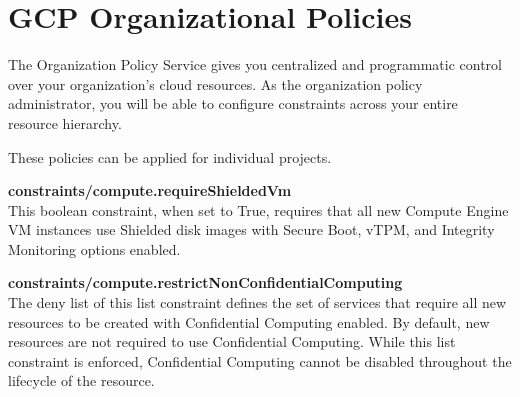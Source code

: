 
\section{GCP Organizational Policies}


The Organization Policy Service gives you 
centralized and programmatic control over your organization's cloud resources. 
As the organization policy administrator, 
you will be able to configure constraints across your entire resource hierarchy. 

These policies can be applied for individual projects.

\textbf{constraints/compute.requireShieldedVm}\\
This boolean constraint, when set to True, 
requires that all new Compute Engine VM instances use Shielded disk images 
with Secure Boot, vTPM, and Integrity Monitoring options enabled.

\textbf{constraints/compute.restrictNonConfidentialComputing}\\
The deny list of this list constraint defines the set of services 
that require all new resources to be created with Confidential Computing enabled.
By default, new resources are not required to use Confidential Computing. 
While this list constraint is enforced, 
Confidential Computing cannot be disabled 
throughout the lifecycle of the resource.

